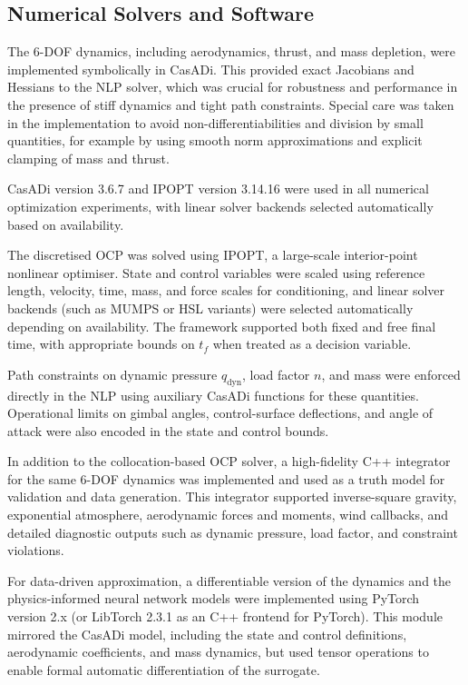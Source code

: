 \subsection{Numerical Solvers and Software}

The 6-DOF dynamics, including aerodynamics, thrust, and mass depletion, were
implemented symbolically in CasADi. This provided exact Jacobians and Hessians to
the NLP solver, which was crucial for robustness and performance in the presence
of stiff dynamics and tight path constraints. Special care was taken in the
implementation to avoid non-differentiabilities and division by small quantities,
for example by using smooth norm approximations and explicit clamping of mass
and thrust.

\noindent CasADi version 3.6.7 and IPOPT version 3.14.16 were used in all 
numerical optimization experiments, with linear solver backends selected 
automatically based on availability.

The discretised OCP was solved using IPOPT, a large-scale interior-point
nonlinear optimiser. State and control variables were scaled using reference
length, velocity, time, mass, and force scales for conditioning, and
linear solver backends (such as MUMPS or HSL variants) were selected
automatically depending on availability. The framework supported both fixed and
free final time, with appropriate bounds on \(t_f\) when treated as a decision
variable.

Path constraints on dynamic pressure \(q_\mathrm{dyn}\), load factor \(n\), and
mass were enforced directly in the NLP using auxiliary CasADi functions for these
quantities. Operational limits on gimbal angles, control-surface deflections,
and angle of attack were also encoded in the state and control bounds.

In addition to the collocation-based OCP solver, a high-fidelity C++
integrator for the same 6-DOF dynamics was implemented and used as a truth
model for validation and data generation. This integrator supported
inverse-square gravity, exponential atmosphere, aerodynamic forces and moments,
wind callbacks, and detailed diagnostic outputs such as dynamic pressure, load
factor, and constraint violations.

For data-driven approximation, a differentiable version of the dynamics and the 
physics-informed neural network models were implemented using PyTorch~\cite{paszke2019} 
version 2.x (or LibTorch 2.3.1 as an C++ frontend for PyTorch). 
This module mirrored the CasADi model, including the state and control definitions, 
aerodynamic coefficients, and mass dynamics, but used tensor operations to enable formal 
automatic differentiation of the surrogate.

